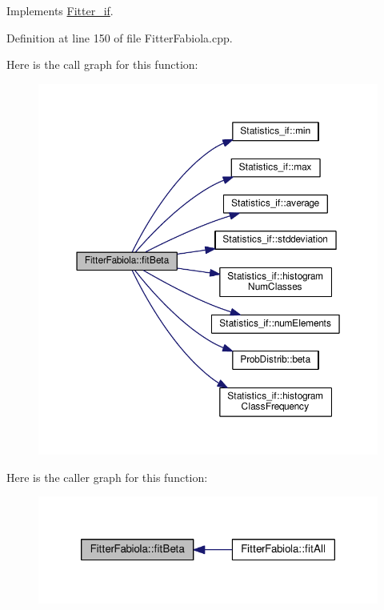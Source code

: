 Implements \hyperlink{class_fitter__if_a8ea1e6520f191368274fec5ab8e5f182}{Fitter\-\_\-if}.



Definition at line 150 of file Fitter\-Fabiola.\-cpp.



Here is the call graph for this function\-:
\nopagebreak
\begin{figure}[H]
\begin{center}
\leavevmode
\includegraphics[width=350pt]{class_fitter_fabiola_a6de9b0d16c19105a540608cb27faf44b_cgraph}
\end{center}
\end{figure}




Here is the caller graph for this function\-:
\nopagebreak
\begin{figure}[H]
\begin{center}
\leavevmode
\includegraphics[width=318pt]{class_fitter_fabiola_a6de9b0d16c19105a540608cb27faf44b_icgraph}
\end{center}
\end{figure}


